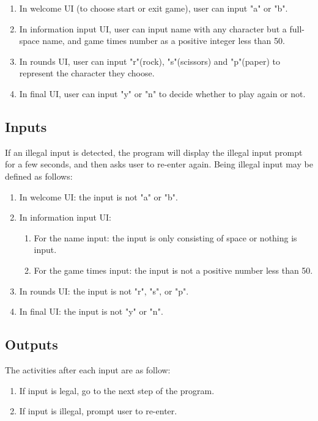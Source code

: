 \documentclass[12pt]{article}
\begin{document}
	\begin{enumerate}
	\item In welcome UI (to choose start or exit game), user can input "a" or "b".
	\item In information input UI, user can input name with any character but a full-space name, and game times number as a positive integer less than 50.
	\item In rounds UI, user can input "r"(rock), "s"(scissors) and "p"(paper) to represent the character they choose.
	\item In final UI, user can input "y" or "n" to decide whether to play again or not.
	\end{enumerate}

	\subsection{Inputs}
	If an illegal input is detected, the program will display the illegal input prompt for a few seconds, and then asks user to re-enter again. Being illegal input may be defined as follows:
	
	\begin{enumerate}
	\item In welcome UI: the input is not "a" or "b".
	\item In information input UI:
	
		\begin{enumerate}[1)]
		\item For the name input: the input is only consisting of space or nothing is input.
		\item For the game times input: the input is not a positive number less than 50.
		\end{enumerate}
	
	\item In rounds UI: the input is not "r", "s", or "p".
	\item In final UI: the input is not "y" or "n".
	\end{enumerate}

	\subsection{Outputs}
	The activities after each input are as follow:
	
	\begin{enumerate}
	\item If input is legal, go to the next step of the program.	
	\item If input is illegal, prompt user to re-enter.
	\end{enumerate}
	
\end{document}
